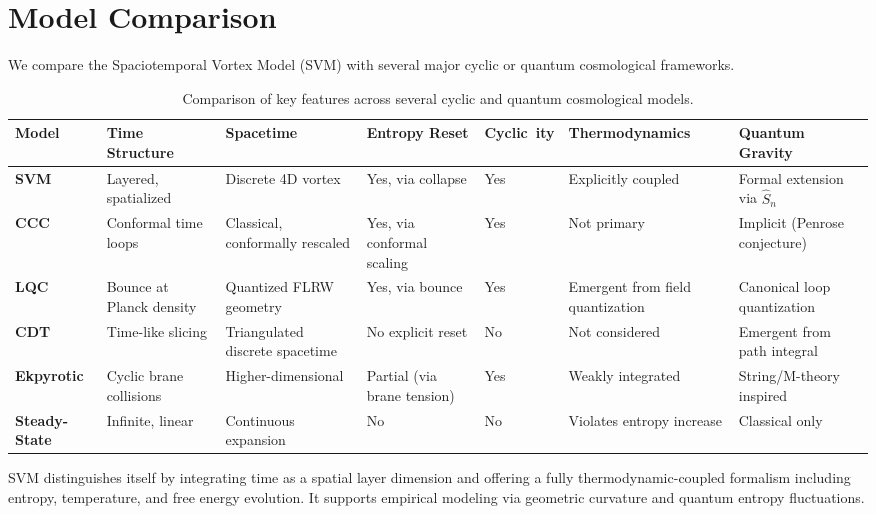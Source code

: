 


\section{Model Comparison}

We compare the Spaciotemporal Vortex Model (SVM) with several major cyclic or quantum cosmological frameworks.

\begin{table}[htbp]
\centering
\footnotesize
\begin{tabularx}{\textwidth}{|l|X|X|X|X|X|X|}
\hline
\textbf{Model} & \textbf{Time Structure} & \textbf{Spacetime} & \textbf{Entropy Reset} & \textbf{Cyclic~\cite{steinhardt2002cyclic}ity} & \textbf{Thermodynamics} & \textbf{Quantum Gravity} \\
\hline
\textbf{SVM} & Layered, spatialized & Discrete 4D vortex & Yes, via collapse & Yes & Explicitly coupled & Formal extension via $\hat{S}_n$ \\
\textbf{CCC} & Conformal time loops & Classical, conformally rescaled & Yes, via conformal scaling & Yes & Not primary & Implicit (Penrose~\cite{penrose2010cycles} conjecture) \\
\textbf{LQC} & Bounce at Planck density & Quantized FLRW geometry & Yes, via bounce & Yes & Emergent from field quantization & Canonical loop quantization \\
\textbf{CDT} & Time-like slicing & Triangulated discrete spacetime & No explicit reset & No & Not considered & Emergent from path integral \\
\textbf{Ekpyrotic} & Cyclic brane collisions & Higher-dimensional & Partial (via brane tension) & Yes & Weakly integrated & String/M-theory inspired \\
\textbf{Steady-State} & Infinite, linear & Continuous expansion & No & No & Violates entropy increase & Classical only \\
\hline
\end{tabularx}
\caption{Comparison of key features across several cyclic and quantum cosmological models.}
\end{table}

\medskip

SVM distinguishes itself by integrating time as a spatial layer dimension and offering a fully thermodynamic-coupled formalism including entropy, temperature, and free energy evolution. It supports empirical modeling via geometric curvature and quantum entropy fluctuations.
